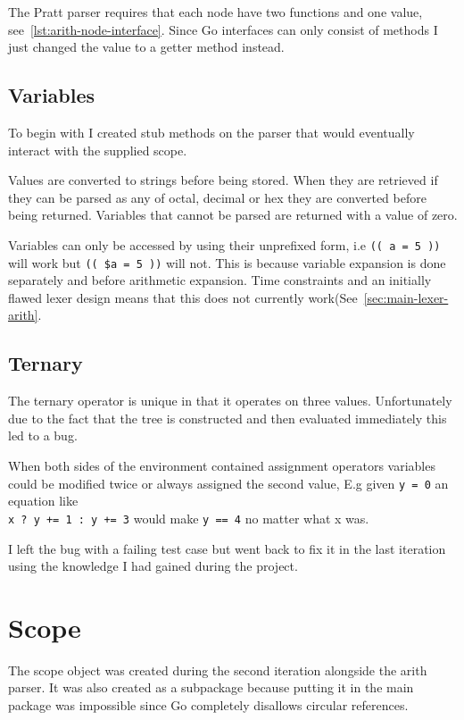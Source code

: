 The Pratt parser requires that each node have two functions and one value, see~\ref{lst:arith-node-interface}.
Since Go interfaces can only consist of methods I just changed the value to a getter method instead.

\subsection{Variables}
To begin with I created stub methods on the parser that would eventually interact with the supplied scope.

Values are converted to strings before being stored.
When they are retrieved if they can be parsed as any of octal, decimal or hex they are converted before being returned.
Variables that cannot be parsed are returned with a value of zero.

Variables can only be accessed by using their unprefixed form, i.e \verb!(( a = 5 ))! will work but \verb!(( $a = 5 ))! will not.
This is because variable expansion is done separately and before arithmetic expansion.
Time constraints and an initially flawed lexer design means that this does not currently work(See~\ref{sec:main-lexer-arith}.

\subsection{Ternary}
The ternary operator is unique in that it operates on three values.
Unfortunately due to the fact that the tree is constructed and then evaluated immediately this led to a bug.

When both sides of the environment contained assignment operators variables could be modified twice or always assigned the second value, E.g given \verb!y = 0! an equation like \\ \verb!x ? y += 1 : y += 3! would make \verb!y == 4! no matter what x was.

I left the bug with a failing test case but went back to fix it in the last iteration using the knowledge I had gained during the project.

\section{Scope}
\label{sec:scope}
The scope object was created during the second iteration alongside the arith parser.
It was also created as a subpackage because putting it in the main package was impossible since Go completely disallows circular references.

